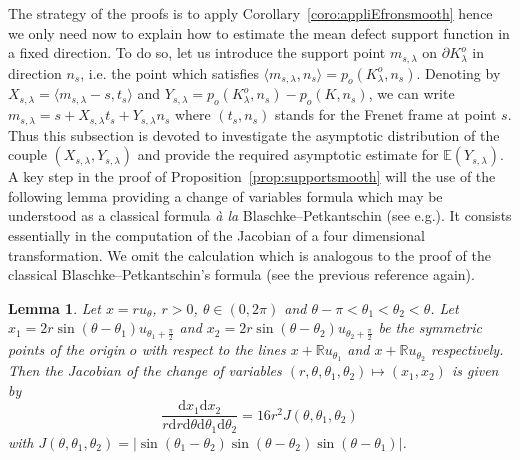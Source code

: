 \documentclass[10pt]{amsart}
\newtheorem{lemm}[theo]{Lemma}\newtheorem{prop}[theo]{Proposition}\newtheorem{coro}[theo]{Corollary}\newtheorem{conj}[theo]{Conjecture}
\theoremstyle{definition}\newtheorem{defi}[theo]{Definition}\newtheorem{rema}[theo]{Remark}\newtheorem{exam}[theo]{Example}\newtheorem{exem}[theo]{Example}\newtheorem{nota}[theo]{Notation}
\newcommand{\dd}{\mathrm{d}}
\newcommand{\E}{\mathbb{E}}
\newcommand{\R}{\mathbb{R}}
\newcommand{\pass}{\vspace{0.3cm}\noindent}
\newcommand{\noi}{\noindent}
\begin{document}

The strategy of the proofs is to apply Corollary~\ref{coro:appliEfronsmooth} hence we only need now to explain how to estimate the mean defect support function in a fixed direction. To do so, let us introduce the support point $m_{s,\lambda}$ on $\partial K_{\lambda}^o$ in direction $n_s$, i.e. the point which satisfies $\langle m_{s,\lambda}, n_s\rangle=p_o(K_{\lambda}^o,n_s)$. Denoting by $X_{s,\lambda}=\langle m_{s,\lambda}-s,t_s\rangle$ and $Y_{s,\lambda}= p_o(K_{\lambda}^o,n_s)-p_o(K,n_s)$, we can write $m_{s,\lambda}=s+X_{s,\lambda}t_{s}+Y_{s,\lambda} n_s$ where $(t_s,n_s)$ stands for the Frenet frame at point $s$. Thus this subsection is devoted to investigate the asymptotic distribution of the couple $(X_{s,\lambda},Y_{s,\lambda})$ and provide the required asymptotic estimate for $\E(Y_{s,\lambda})$. A key step in the proof of Proposition~\ref{prop:supportsmooth} will the use of the following lemma providing a change of variables formula which may be understood as a classical formula \emph{à la} Blaschke--Petkantschin (see e.g.\cite[Theorem~7.3.1]{SW}). It consists essentially in the computation of the Jacobian of a four dimensional transformation. We omit the calculation which is analogous to the proof of the classical Blaschke--Petkantschin's formula (see the previous reference again).

\begin{lemm}\label{lem:jacob}
Let $x=r u_{\theta}$, $r>0$, $\theta\in (0,2\pi)$ and $\theta-\pi<\theta_1<\theta_2<\theta$. Let $x_1=2r\sin(\theta-\theta_1)u_{\theta_1+\frac{\pi}{2}}$ and $x_2=2r\sin(\theta-\theta_2)u_{\theta_2+\frac{\pi}{2}}$ be the symmetric points of the origin $o$ with respect to the lines $x+\R u_{\theta_1}$ and $x+\R u_{\theta_2}$ respectively. Then the Jacobian of the change of variables $(r,\theta,\theta_1,\theta_2)\longmapsto (x_1,x_2)$ is given by
\[
\frac{\dd x_1 \dd x_2}{r \dd r \dd \theta\dd \theta_1\dd \theta_2} = 16 r^2 J(\theta,\theta_1,\theta_2)
\]
with $J(\theta,\theta_1,\theta_2) = |\sin(\theta_1-\theta_2)\sin(\theta-\theta_2)\sin(\theta-\theta_1)|$.
\end{lemm}
\end{document}
